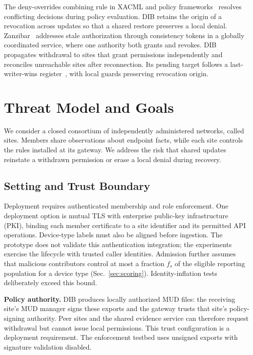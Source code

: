 \documentclass[journal]{IEEEtran}
\theoremstyle{definition}
\begin{document}
The deny-overrides combining rule in XACML and policy frameworks~\cite{xacml3,ponder} resolves conflicting decisions during policy evaluation. DIB retains the origin of a revocation across updates so that a shared restore preserves a local denial. Zanzibar~\cite{zanzibar} addresses stale authorization through consistency tokens in a globally coordinated service, where one authority both grants and revokes. DIB propagates withdrawal to sites that grant permissions independently and reconciles unreachable sites after reconnection. Its pending target follows a last-writer-wins register~\cite{crdt}, with local guards preserving revocation origin.

\section{Threat Model and Goals}
\label{sec:threat}

We consider a closed consortium of independently administered networks, called sites. Members share observations about endpoint facts, while each site controls the rules installed at its gateway. We address the risk that shared updates reinstate a withdrawn permission or erase a local denial during recovery.

\subsection{Setting and Trust Boundary}
\label{subsec:trust}
Deployment requires authenticated membership and role enforcement. One deployment option is mutual TLS with enterprise public-key infrastructure (PKI), binding each member certificate to a site identifier and its permitted API operations. Device-type labels must also be aligned before ingestion. The prototype does not validate this authentication integration; the experiments exercise the lifecycle with trusted caller identities. Admission further assumes that malicious contributors control at most a fraction $f_s$ of the eligible reporting population for a device type (Sec.~\ref{sec:scoring}). Identity-inflation tests deliberately exceed this bound.

\textbf{Policy authority.} DIB produces locally authorized MUD files: the receiving site's MUD manager signs these exports and the gateway trusts that site's policy-signing authority. Peer sites and the shared evidence service can therefore request withdrawal but cannot issue local permissions. This trust configuration is a deployment requirement. The enforcement testbed uses unsigned exports with signature validation disabled.
\end{document}

